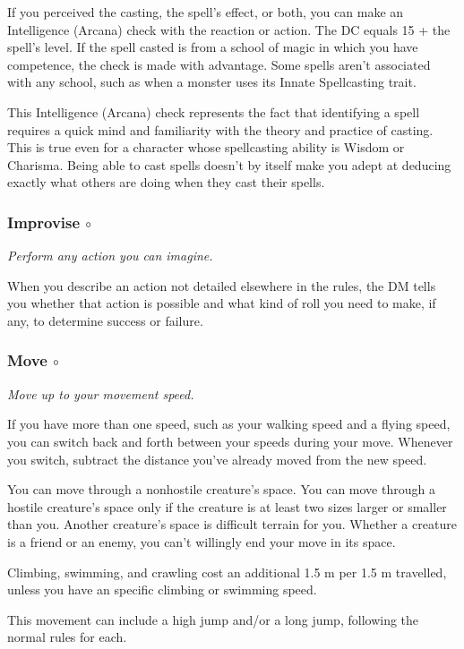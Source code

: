     If you perceived the casting, the spell's effect, or both, you can make an Intelligence (Arcana) check with the reaction or action.
    The DC equals 15 + the spell's level.
    If the spell casted is from a school of magic in which you have competence, the check is made with advantage.
    Some spells aren't associated with any school, such as when a monster uses its Innate Spellcasting trait.

    This Intelligence (Arcana) check represents the fact that identifying a spell requires a quick mind and familiarity with the theory and practice of casting.
    This is true even for a character whose spellcasting ability is Wisdom or Charisma.
    Being able to cast spells doesn't by itself make you adept at deducing exactly what others are doing when they cast their spells.

\subsubsection{Improvise $\circ$}
    \textit{Perform any action you can imagine.}

    When you describe an action not detailed elsewhere in the rules, the DM tells you whether that action is possible and what kind of roll you need to make, if any, to determine success or failure.

\subsubsection{Move $\circ$}
    \textit{Move up to your movement speed.}

    If you have more than one speed, such as your walking speed and a flying speed, you can switch back and forth between your speeds during your move.
    Whenever you switch, subtract the distance you've already moved from the new speed.

    You can move through a nonhostile creature's space.
    You can move through a hostile creature's space only if the creature is at least two sizes larger or smaller than you.
    Another creature's space is difficult terrain for you.
    Whether a creature is a friend or an enemy, you can't willingly end your move in its space.

    Climbing, swimming, and crawling cost an additional 1.5 m per 1.5 m travelled, unless you have an specific climbing or swimming speed.

    This movement can include a high jump and/or a long jump, following the normal rules for each.

